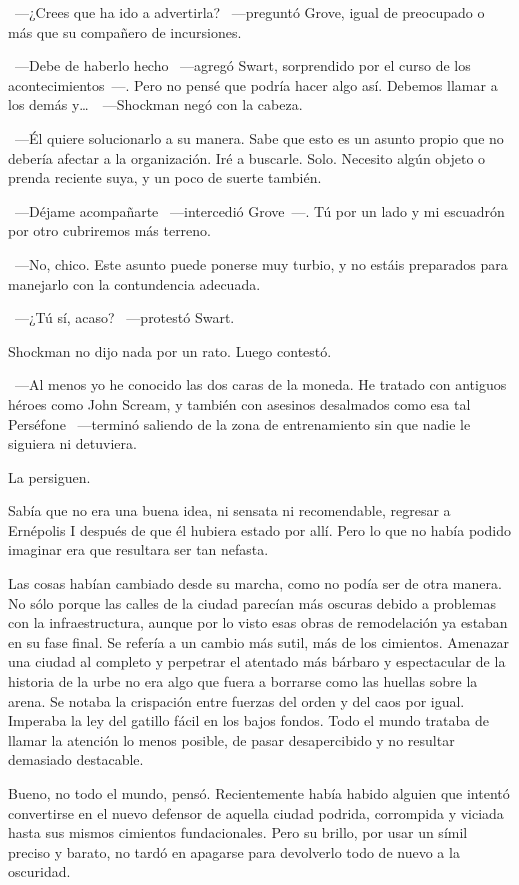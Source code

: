 ~---¿Crees que ha ido a advertirla? ~---preguntó Grove, igual de preocupado o más que su compañero de incursiones.

~---Debe de haberlo hecho ~---agregó Swart, sorprendido por el curso de los acontecimientos~---. Pero no pensé que podría hacer algo así. Debemos llamar a los demás y\dots\ ~---Shockman negó con la cabeza.

~---Él quiere solucionarlo a su manera. Sabe que esto es un asunto propio que no debería afectar a la organización. Iré a buscarle. Solo. Necesito algún objeto o prenda reciente suya, y un poco de suerte también.

~---Déjame acompañarte ~---intercedió Grove~---. Tú por un lado y mi escuadrón por otro cubriremos más terreno.

~---No, chico. Este asunto puede ponerse muy turbio, y no estáis preparados para manejarlo con la contundencia adecuada.

~---¿Tú sí, acaso? ~---protestó Swart.

Shockman no dijo nada por un rato. Luego contestó.

~---Al menos yo he conocido las dos caras de la moneda. He tratado con antiguos héroes como John Scream, y también con asesinos desalmados como esa tal Perséfone ~---terminó saliendo de la zona de entrenamiento sin que nadie le siguiera ni detuviera.

\parbreak
La persiguen.

Sabía que no era una buena idea, ni sensata ni recomendable, regresar a Ernépolis I después de que él hubiera estado por allí. Pero lo que no había podido imaginar era que resultara ser tan nefasta.

Las cosas habían cambiado desde su marcha, como no podía ser de otra manera. No sólo porque las calles de la ciudad parecían más oscuras debido a problemas con la infraestructura, aunque por lo visto esas obras de remodelación ya estaban en su fase final. Se refería a un cambio más sutil, más de los cimientos. Amenazar una ciudad al completo y perpetrar el atentado más bárbaro y espectacular de la historia de la urbe no era algo que fuera a borrarse como las huellas sobre la arena. Se notaba la crispación entre fuerzas del orden y del caos por igual. Imperaba la ley del gatillo fácil en los bajos fondos. Todo el mundo trataba de llamar la atención lo menos posible, de pasar desapercibido y no resultar demasiado destacable.

Bueno, no todo el mundo, pensó. Recientemente había habido alguien que intentó convertirse en el nuevo defensor de aquella ciudad podrida, corrompida y viciada hasta sus mismos cimientos fundacionales. Pero su brillo, por usar un símil preciso y barato, no tardó en apagarse para devolverlo todo de nuevo a la oscuridad.

